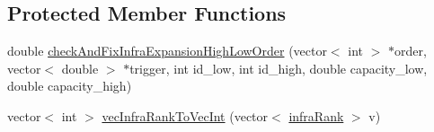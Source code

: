 \subsection*{Protected Member Functions}
\begin{DoxyCompactItemize}
\item 
double \mbox{\hyperlink{classProblem_ab9750751c2d4468a3dfe5dd6573b5179}{check\+And\+Fix\+Infra\+Expansion\+High\+Low\+Order}} (vector$<$ int $>$ $\ast$order, vector$<$ double $>$ $\ast$trigger, int id\+\_\+low, int id\+\_\+high, double capacity\+\_\+low, double capacity\+\_\+high)
\item 
vector$<$ int $>$ \mbox{\hyperlink{classProblem_ac157541eb885c80f2d2f23cc97a6a997}{vec\+Infra\+Rank\+To\+Vec\+Int}} (vector$<$ \mbox{\hyperlink{structinfraRank}{infra\+Rank}} $>$ v)
\end{DoxyCompactItemize}
